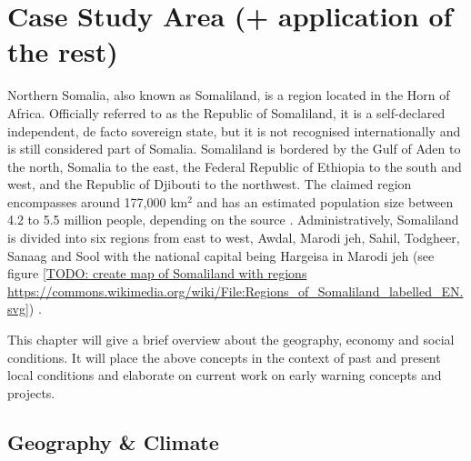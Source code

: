 \section{Case Study Area (+ application of the rest)} %

Northern Somalia, also known as Somaliland, is a region located in the Horn of Africa. Officially referred to as the Republic of Somaliland, it is a self-declared independent, de facto sovereign state, but it is not recognised internationally and is still considered part of Somalia. Somaliland is bordered by the Gulf of Aden to the north, Somalia to the east, the Federal Republic of Ethiopia to the south and west, and the Republic of Djibouti to the northwest. The claimed region encompasses around 177,000 km$^2$ and has an estimated population size between 4.2 to 5.5 million people, depending on the source \autocite{petrucciLandscapeLandformsNorthern2022,republicofsomaliaCountryProfile20212021,somaliredcrescentsocietyFeasibilityStudyPotential2022}. Administratively, Somaliland is divided into six regions from east to west, Awdal, Marodi jeh, Sahil, Todgheer, Sanaag and Sool with the national capital being Hargeisa in Marodi jeh (see figure \ref*{TODO: create map of Somaliland with regions https://commons.wikimedia.org/wiki/File:Regions_of_Somaliland_labelled_EN.svg}) \autocite{republicofsomaliaCountryProfile20212021}.


This chapter will give a brief overview about the geography, economy and social conditions. It will place the above concepts in the context of past and present local conditions and elaborate on current work on early warning concepts and projects. 


\subsection{Geography \& Climate}

